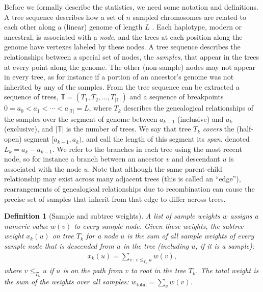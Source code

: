 \documentclass[9pt,twoside,lineno]{gsajnl}
\newtheorem{definition}{Definition}
\newcommand{\treeseq}{\mathbb{T}} %
\newcommand{\iw}{w} %
\newcommand{\tiw}{w_\text{total}} %
\newcommand{\nw}{x} %
\begin{document}
Before we formally describe the statistics, we need some notation and definitions.
A tree sequence describes how a set of $n$ sampled chromosomes
are related to each other along a (linear) genome of length $L$ \citep{kelleher2016efficient,kelleher2018efficient}.
Each haplotype, modern or ancestral, is associated with a \emph{node},
and the trees at each position along the genome have vertexes labeled by these nodes.
A tree sequence describes the relationships between a special set of nodes, the \emph{samples},
that appear in the trees at every point along the genome.
The other (non-sample) nodes may not appear in every tree,
as for instance if a portion of an ancestor's genome was not inherited by any of the samples.
From the tree sequence can be extracted a sequence of trees,
$\treeseq = (T_1, T_2, \ldots, T_{|\treeseq|})$
and a sequence of breakpoints $0 = a_0 < a_1 < \cdots < a_{|\treeseq|} = L$,
where $T_k$ describes the genealogical relationships of the samples
over the segment of genome between $a_{k-1}$ (inclusive) and $a_k$ (exclusive),
and $|\treeseq|$ is the number of trees.
We say that tree $T_k$ \emph{covers} the (half-open) segment $[a_{k-1}, a_k)$,
and call the length of this segment its \emph{span}, denoted $L_k = a_k - a_{k-1}$.
We refer to the branches in each tree using the most recent node,
so for instance a branch between an ancestor $v$ and descendant $u$
is associated with the node $u$.
Note that although the same parent-child relationship may exist across many adjacent trees
(this is called an ``edge''),
rearrangements of genealogical relationships due to recombination
can cause the precise set of samples that inherit from that edge to differ across trees.

\begin{definition}[Sample and subtree weights] \label{defn:weights}
    A list of \emph{sample weights} $\iw$ assigns a numeric value $\iw(v)$
    to every sample node.
    Given these weights,
    the \emph{subtree weight} $\nw_k(u)$ on tree $T_k$
    for a node $u$ is the sum of all sample weights
    of every sample node that is descended from $u$ in the tree (including $u$, if it is a sample):
    \begin{align*}
        \nw_k(u) = \sum_{v \,:\, v \le_{T_k} u} \iw(v) ,
    \end{align*}
    where $v \le_{T_k} u$ if $u$ is on the path from $v$ to root in the tree $T_k$.
    The \emph{total weight} is the sum of the weights over all samples:
    $\tiw = \sum_v \iw(v)$.
\end{definition}
\end{document}
